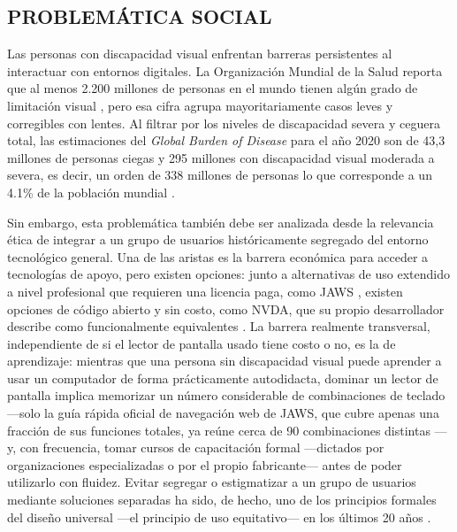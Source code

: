 
\subsection{PROBLEMÁTICA SOCIAL}

Las personas con discapacidad visual enfrentan barreras persistentes al interactuar con entornos digitales. La Organización Mundial de la Salud reporta que al menos 2.200 millones de personas en el mundo tienen algún grado de limitación visual \cite{who2026blindness}, pero esa cifra agrupa mayoritariamente casos leves y corregibles con lentes. Al filtrar por los niveles de discapacidad severa y ceguera total, las estimaciones del \textit{Global Burden of Disease} para el año 2020 son de 43,3 millones de personas ciegas y 295 millones con discapacidad visual moderada a severa, es decir, un orden de 338 millones de personas lo que corresponde a un 4.1\% de la población mundial \cite{bourne2021trends}.

Sin embargo, esta problemática también debe ser analizada desde la relevancia ética de integrar a un grupo de usuarios históricamente segregado del entorno tecnológico general. Una de las aristas es la barrera económica para acceder a tecnologías de apoyo, pero existen opciones: junto a alternativas de uso extendido a nivel profesional que requieren una licencia paga, como JAWS \cite{freedomscientific2024jaws}, existen opciones de código abierto y sin costo, como NVDA, que su propio desarrollador describe como funcionalmente equivalentes \cite{nvaccess2024about}. La barrera realmente transversal, independiente de si el lector de pantalla usado tiene costo o no, es la de aprendizaje: mientras que una persona sin discapacidad visual puede aprender a usar un computador de forma prácticamente autodidacta, dominar un lector de pantalla implica memorizar un número considerable de combinaciones de teclado —solo la guía rápida oficial de navegación web de JAWS, que cubre apenas una fracción de sus funciones totales, ya reúne cerca de 90 combinaciones distintas \cite{dequeuniversity2019jawsguide}— y, con frecuencia, tomar cursos de capacitación formal —dictados por organizaciones especializadas o por el propio fabricante— antes de poder utilizarlo con fluidez. Evitar segregar o estigmatizar a un grupo de usuarios mediante soluciones separadas ha sido, de hecho, uno de los principios formales del diseño universal —el principio de uso equitativo— en los últimos 20 años \cite{centerforuniversaldesign1997}.

